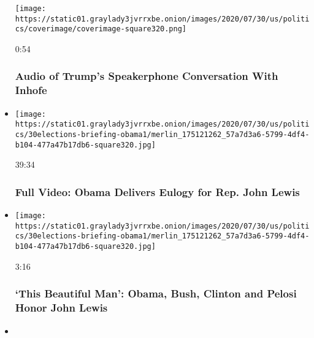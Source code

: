 \begin{itemize}
  \texttt{[image: https://static01.graylady3jvrrxbe.onion/images/2020/07/30/us/politics/coverimage/coverimage-square320.png]}

  0:54

  \hypertarget{audio-of-trumps-speakerphone-conversation-with-inhofe}{%
  \subsubsection{Audio of Trump's Speakerphone Conversation With
  Inhofe}\label{audio-of-trumps-speakerphone-conversation-with-inhofe}}
\item
  \href{https://www.nytimes3xbfgragh.onion/video/us/100000007264733/obama-john-lewis-funeral.html?action=click\&module=video-series-bar\&region=header\&pgtype=Article\&playlistId=video/latest-video}{}

  \texttt{[image: https://static01.graylady3jvrrxbe.onion/images/2020/07/30/us/politics/30elections-briefing-obama1/merlin\_175121262\_57a7d3a6-5799-4df4-b104-477a47b17db6-square320.jpg]}

  39:34

  \hypertarget{full-video-obama-delivers-eulogy-for-rep-john-lewis}{%
  \subsubsection{Full Video: Obama Delivers Eulogy for Rep. John
  Lewis}\label{full-video-obama-delivers-eulogy-for-rep-john-lewis}}
\item
  \href{https://www.nytimes3xbfgragh.onion/video/us/politics/100000007264823/john-lewis-funeral.html?action=click\&module=video-series-bar\&region=header\&pgtype=Article\&playlistId=video/latest-video}{}

  \texttt{[image: https://static01.graylady3jvrrxbe.onion/images/2020/07/30/us/politics/30elections-briefing-obama1/merlin\_175121262\_57a7d3a6-5799-4df4-b104-477a47b17db6-square320.jpg]}

  3:16

  \hypertarget{this-beautiful-man-obama-bush-clinton-and-pelosi-honor-john-lewis}{%
  \subsubsection{`This Beautiful Man': Obama, Bush, Clinton and Pelosi
  Honor John
  Lewis}\label{this-beautiful-man-obama-bush-clinton-and-pelosi-honor-john-lewis}}
\item
  \href{https://www.nytimes3xbfgragh.onion/video/us/100000007264604/nasas-perseverance-mars.html?action=click\&module=video-series-bar\&region=header\&pgtype=Article\&playlistId=video/latest-video}{}


\end{itemize}
